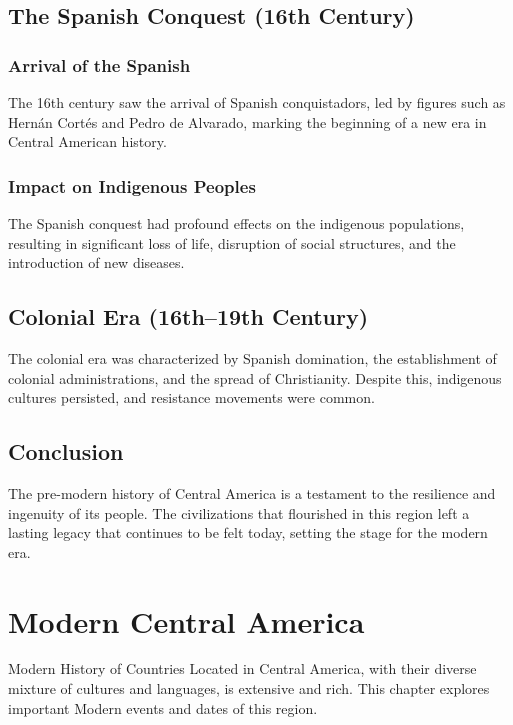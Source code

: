 \documentclass{book}
\begin{document}
\section{The Spanish Conquest (16th Century)}
\label{sec:spanish-conquest}
\subsection{Arrival of the Spanish}
\label{subsec:arrival-spanish}
The 16th century saw the arrival of Spanish conquistadors, led by figures such as Hernán Cortés and Pedro de Alvarado, marking the beginning of a new era in Central American history.

\subsection{Impact on Indigenous Peoples}
\label{subsec:impact-indigenous-peoples}
The Spanish conquest had profound effects on the indigenous populations, resulting in significant loss of life, disruption of social structures, and the introduction of new diseases.

\section{Colonial Era (16th–19th Century)}
\label{sec:colonial-era}
The colonial era was characterized by Spanish domination, the establishment of colonial administrations, and the spread of Christianity. Despite this, indigenous cultures persisted, and resistance movements were common.

\section{Conclusion}
\label{sec:conclusion-pre-modern-central-america}
The pre-modern history of Central America is a testament to the resilience and ingenuity of its people. The civilizations that flourished in this region left a lasting legacy that continues to be felt today, setting the stage for the modern era.

\chapter{Modern Central America}
\label{ch:modern-history-central-america}

Modern History of Countries Located in Central America, with their diverse mixture of cultures and languages, is extensive and rich. This chapter explores important Modern events and dates of this region.
\end{document}
